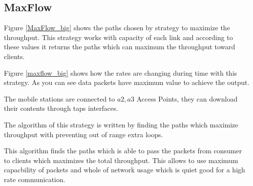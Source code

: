 











\subsection{MaxFlow}
Figure \ref{MaxFlow_big} shows the paths chosen by strategy to maximize the throughput. This strategy works with capacity of each link and according to these values it returns the paths which can maximum the throughput toward clients.

Figure \ref{maxflow_big} shows how the rates are changing during time with this strategy. As you can see data packets have maximum value to achieve the output.  

The mobile stations are connected to $a2,a3$ Access Points, they can download their contents through taps interfaces.

The algorithm of this strategy is written by finding the paths which maximize throughput with preventing out of range extra loops.

This algorithm finds the paths which is able to pass the packets from consumer to clients which maximizes the  total throughput. This allows to use maximum capacbility of packets and whole of network usage which is quiet good for a high rate communication.

